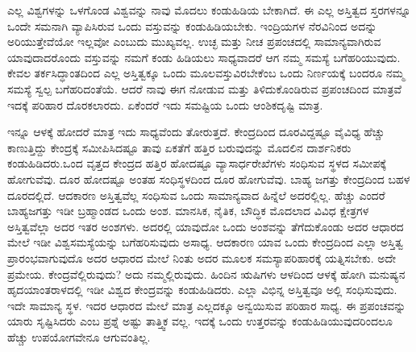 ಎಲ್ಲ ವಿಶ್ವಗಳನ್ನು ಒಳಗೊಂಡ ವಿಶ್ವವನ್ನು ನಾವು ಮೊದಲು ಕಂಡುಹಿಡಿಯ ಬೇಕಾಗಿದೆ. ಈ ಎಲ್ಲ ಅಸ್ತಿತ್ವದ ಸ್ತರಗಳನ್ನೂ ಒಂದೇ ಸಮನಾಗಿ ವ್ಯಾಪಿಸಿರುವ ಒಂದು ವಸ್ತುವನ್ನು ಕಂಡುಹಿಡಿಯಬೇಕು. ಇಂದ್ರಿಯಗಳ ನೆರವಿನಿಂದ ಅದನ್ನು ಅರಿಯುತ್ತೇವೆಯೋ ಇಲ್ಲವೋ ಎಂಬುದು ಮುಖ್ಯವಲ್ಲ. ಉಚ್ಛ ಮತ್ತು ನೀಚ ಪ್ರಪಂಚದಲ್ಲಿ ಸಾಮಾನ್ಯವಾಗಿರುವ ಯಾವುದಾದರೊಂದು ವಸ್ತುವನ್ನು ನಮಗೆ ಕಂಡು ಹಿಡಿಯಲು ಸಾಧ್ಯವಾದರೆ ಆಗ ನಮ್ಮ ಸಮಸ್ಯೆ ಬಗೆಹರಿಯುವುದು. ಕೇವಲ ತರ್ಕಸಿದ್ಧಾಂತದಿಂದ ಎಲ್ಲ ಅಸ್ತಿತ್ವಕ್ಕೂ ಒಂದು ಮೂಲವಸ್ತುವಿರಬೇಕೆಂಬ ಒಂದು ನಿರ್ಣಯಕ್ಕೆ ಬಂದರೂ ನಮ್ಮ ಸಮಸ್ಯೆ ಸ್ವಲ್ಪ ಬಗೆಹರಿದಂತೆಯೆ. ಆದರೆ ನಾವು ಈಗ ನೋಡುವ ಮತ್ತು ತಿಳಿದುಕೊಂಡಿರುವ ಪ್ರಪಂಚದಿಂದ ಮಾತ್ರವೆ ಇದಕ್ಕೆ ಪರಿಹಾರ ದೊರಕಲಾರದು. ಏಕೆಂದರೆ ಇದು ಸಮಷ್ಟಿಯ ಒಂದು ಆಂಶಿಕದೃಷ್ಟಿ ಮಾತ್ರ.

ಇನ್ನೂ ಆಳಕ್ಕೆ ಹೋದರೆ ಮಾತ್ರ ಇದು ಸಾಧ್ಯವೆಂದು ತೋರುತ್ತದೆ. ಕೇಂದ್ರದಿಂದ ದೂರವಿದ್ದಷ್ಟೂ ವೈವಿಧ್ಯ ಹೆಚ್ಚು ಕಾಣುತ್ತಿದ್ದು ಕೇಂದ್ರಕ್ಕೆ ಸಮೀಪಿಸಿದಷ್ಟೂ ತಾವು ಏಕತೆಗೆ ಹತ್ತಿರ ಬರುವುದನ್ನು ಮೊದಲಿನ ದಾರ್ಶನಿಕರು ಕಂಡುಹಿಡಿದರು.ಒಂದ ವೃತ್ತದ ಕೇಂದ್ರದ ಹತ್ತಿರ ಹೋದಷ್ಟೂ ವ್ಯಾಸಾರ್ಧರೇಖೆಗಳು ಸಂಧಿಸುವ ಸ್ಥಳದ ಸಮೀಪಕ್ಕೆ ಹೋಗುವೆವು. ದೂರ ಹೋದಷ್ಟೂ ಅಂತಹ ಸಂಧಿಸ್ಥಳದಿಂದ ದೂರ ಹೋಗುವೆವು. ಬಾಹ್ಯ ಜಗತ್ತು ಕೇಂದ್ರದಿಂದ ಬಹಳ ದೂರದಲ್ಲಿದೆ. ಆದಕಾರಣ ಅಸ್ತಿತ್ವವೆಲ್ಲ ಸಂಧಿಸುವ ಒಂದು ಸಾಮಾನ್ಯವಾದ ಹಿನ್ನೆಲೆ ಅದರಲ್ಲಿಲ್ಲ. ಹೆಚ್ಚು ಎಂದರೆ ಬಾಹ್ಯಜಗತ್ತು ಇಡೀ ಬ್ರಹ್ಮಾಂಡದ ಒಂದು ಅಂಶ. ಮಾನಸಿಕ, ನೈತಿಕ, ಬೌದ್ಧಿಕ ಮೊದಲಾದ ವಿವಿಧ ಕ್ಷೇತ್ರಗಳ ಅಸ್ತಿತ್ವವೆಲ್ಲಾ ಅದರ ಇತರ ಅಂಶಗಳು. ಅದರಲ್ಲಿ ಯಾವುದೋ ಒಂದು ಅಂಶವನ್ನು ತೆಗೆದುಕೊಂಡು ಅದರ ಆಧಾರದ ಮೇಲೆ ಇಡೀ ವಿಶ್ವಸಮಸ್ಯೆಯನ್ನು ಬಗೆಹರಿಸುವುದು ಅಸಾಧ್ಯ. ಆದಕಾರಣ ಯಾವ ಒಂದು ಕೇಂದ್ರದಿಂದ ಎಲ್ಲಾ ಅಸ್ತಿತ್ವ ಪ್ರಾರಂಭವಾಗುವುದೊ ಅದರ ಆಧಾರದ ಮೇಲೆ ನಿಂತು ಅದರ ಮೂಲಕ ಸಮಸ್ಯಾಪರಿಹಾರಕ್ಕೆ ಯತ್ನಿಸಬೇಕು. ಅದೇ ಪ್ರಮೇಯ. ಕೇಂದ್ರವೆಲ್ಲಿರುವುದು? ಅದು ನಮ್ಮಲ್ಲಿರುವುದು. ಹಿಂದಿನ ಋಷಿಗಳು ಆಳದಿಂದ ಆಳಕ್ಕೆ ಹೋಗಿ ಮನುಷ್ಯನ ಹೃದಯಾಂತರಾಳದಲ್ಲಿ ಇಡೀ ವಿಶ್ವದ ಕೇಂದ್ರವನ್ನು ಕಂಡುಹಿಡಿದರು. ಎಲ್ಲಾ ವಿಭಿನ್ನ ಅಸ್ತಿತ್ವವೂ ಅಲ್ಲಿ ಸಂಧಿಸುವುದು. ಇದೇ ಸಾಮಾನ್ಯ ಸ್ಥಳ. ಇದರ ಆಧಾರದ ಮೇಲೆ ಮಾತ್ರ ಎಲ್ಲದಕ್ಕೂ ಅನ್ವಯಿಸುವ ಪರಿಹಾರ ಸಾಧ್ಯ. ಈ ಪ್ರಪಂಚವನ್ನು ಯಾರು ಸೃಷ್ಟಿಸಿದರು ಎಂಬ ಪ್ರಶ್ನೆ ಅಷ್ಟು ತಾತ್ತ್ವಿಕ ವಲ್ಲ. ಇದಕ್ಕೆ ಒಂದು ಉತ್ತರವನ್ನು ಕಂಡುಹಿಡಿಯುವುದರಿಂದಲೂ ಹೆಚ್ಚು ಉಪಯೋಗವೇನೂ ಆಗುವಂತಿಲ್ಲ.

